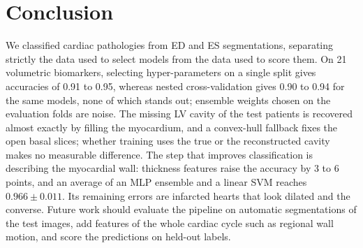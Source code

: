 \section{Conclusion}
We classified cardiac pathologies from ED and ES segmentations, separating strictly the data used to select models from the data used to score them. On 21 volumetric biomarkers, selecting hyper-parameters on a single split gives accuracies of 0.91 to 0.95, whereas nested cross-validation gives 0.90 to 0.94 for the same models, none of which stands out; ensemble weights chosen on the evaluation folds are noise. The missing LV cavity of the test patients is recovered almost exactly by filling the myocardium, and a convex-hull fallback fixes the open basal slices; whether training uses the true or the reconstructed cavity makes no measurable difference. The step that improves classification is describing the myocardial wall: thickness features raise the accuracy by 3 to 6 points, and an average of an MLP ensemble and a linear SVM reaches $0.966 \pm 0.011$. Its remaining errors are infarcted hearts that look dilated and the converse. Future work should evaluate the pipeline on automatic segmentations of the test images, add features of the whole cardiac cycle such as regional wall motion, and score the predictions on held-out labels.
